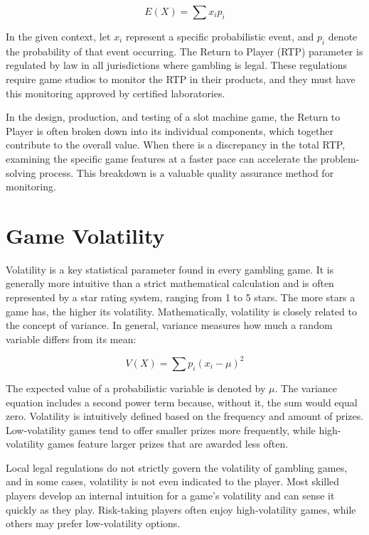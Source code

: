 \documentclass[12pt,twoside,openany]{book}
\begin{document}
\begin{equation}
E(X) = \sum x_i p_i
\label{equation001}
\end{equation}

In the given context, let $x_i$ represent a specific probabilistic event, and $p_i$ denote the probability of that event occurring. The Return to Player (RTP) parameter is regulated by law in all jurisdictions where gambling is legal. These regulations require game studios to monitor the RTP in their products, and they must have this monitoring approved by certified laboratories.

In the design, production, and testing of a slot machine game, the Return to Player is often broken down into its individual components, which together contribute to the overall value. When there is a discrepancy in the total RTP, examining the specific game features at a faster pace can accelerate the problem-solving process. This breakdown is a valuable quality assurance method for monitoring.

\section*{Game Volatility}

Volatility is a key statistical parameter found in every gambling game. It is generally more intuitive than a strict mathematical calculation and is often represented by a star rating system, ranging from 1 to 5 stars. The more stars a game has, the higher its volatility. Mathematically, volatility is closely related to the concept of variance. In general, variance measures how much a random variable differs from its mean:

\begin{equation}
V(X) = \sum p_i (x_i - \mu)^2
\label{equation002}
\end{equation}

The expected value of a probabilistic variable is denoted by $\mu$. The variance equation includes a second power term because, without it, the sum would equal zero. Volatility is intuitively defined based on the frequency and amount of prizes. Low-volatility games tend to offer smaller prizes more frequently, while high-volatility games feature larger prizes that are awarded less often.

Local legal regulations do not strictly govern the volatility of gambling games, and in some cases, volatility is not even indicated to the player. Most skilled players develop an internal intuition for a game's volatility and can sense it quickly as they play. Risk-taking players often enjoy high-volatility games, while others may prefer low-volatility options.
\end{document}
